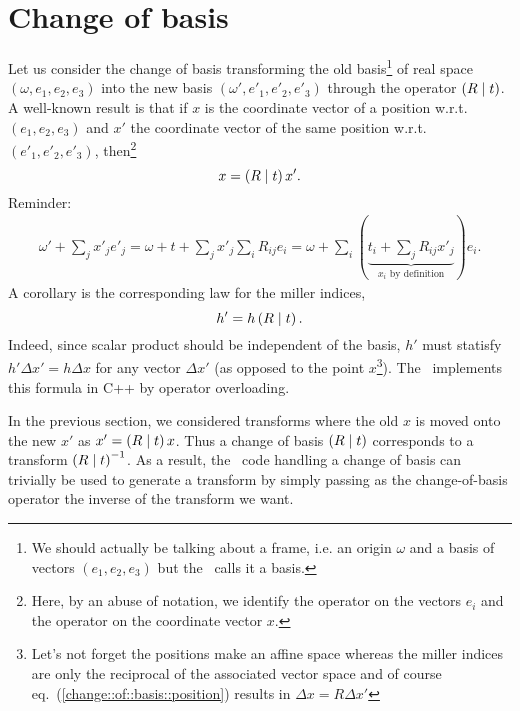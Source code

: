 \documentclass[11pt]{article}
\begin{document}
\section{Change of basis}

Let us consider the change of basis transforming the old basis\footnote{We should actually be talking about a frame, i.e. an origin $\omega$ and a basis of vectors $(e_1, e_2, e_3)$ but the \cctbx\ calls it a basis.} of real space $(\omega, e_1, e_2, e_3)$ into the new basis $(\omega', e'_1, e'_2, e'_3)$ through the operator $\left( R \mid t \right)$. A well-known result is that if $x$ is the coordinate vector of a position w.r.t. $(e_1, e_2, e_3)$ and $x'$ the coordinate vector of the same position w.r.t. $(e'_1, e'_2, e'_3)$, then\footnote{Here, by an abuse of notation, we identify the operator on the vectors $e_i$ and the operator on the coordinate vector $x$.}
\begin{equation}
x = \left( R \mid t \right)x'.
\label{change::of::basis::position}
\end{equation}
Reminder:
\begin{align}
\omega' + \sum_j x'_j e'_j = \omega + t + \sum_j x'_j \sum_i R_{ij} e_i = \omega + \sum_i (\underbrace{t_i + \sum_j R_{ij} x'_j}_{x_i \text{ by definition}})e_i. \nonumber
\end{align}
A corollary is the corresponding law for the miller indices,
\begin{equation}
h' = h\left( R \mid t \right).
\end{equation}
Indeed, since scalar product should be independent of the basis, $h'$ must statisfy $h'\Delta x' = h\Delta x$ for any vector $\Delta x'$ (as opposed to the point $x$\footnote{Let's not forget the positions make an affine space whereas the miller indices are only the reciprocal of the associated vector space and of course eq.~(\ref{change::of::basis::position}) results in $\Delta x = R \Delta x'$}). The \cctbx\ implements this formula in C++ by operator overloading.

In the previous section, we considered transforms where the old $x$ is moved onto the new $x'$ as $x' = \left( R \mid t \right) x$. Thus a change of basis $\left( R \mid t \right)$ corresponds to a transform $\left( R \mid t \right)^{-1}$. As a result, the \cctbx\ code handling a change of basis can trivially be used to generate a transform by simply passing as the change-of-basis operator the inverse of the transform we want.
\end{document}

